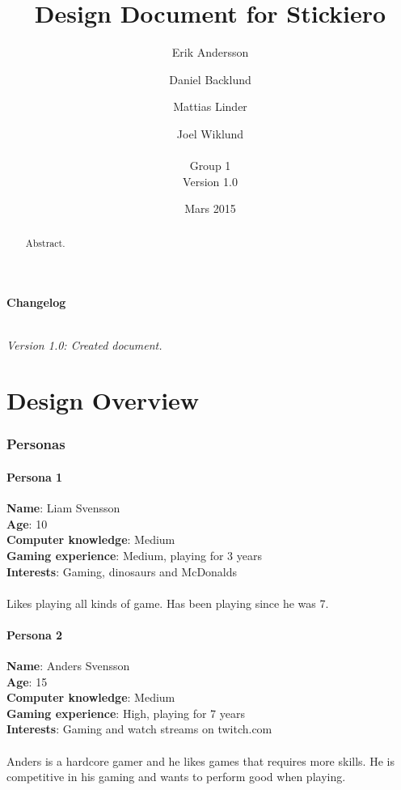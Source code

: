 \documentclass{article}
\title{Design Document for Stickiero}
\author{Erik Andersson \and Daniel Backlund \and Mattias Linder \and Joel Wiklund \\\\Group 1\\Version 1.0}
\date{Mars 2015}
\begin{document}
\maketitle
\clearpage

\begin{abstract}
  Abstract.
\end{abstract}
\tableofcontents

\subsection*{Changelog}
\paragraph{}
\em{}Version 1.0:\em{} Created document.\\ 
\clearpage

\part{Design Overview}
\section{Personas}
\label{sec:label}
\subsection{Persona 1}

\textbf{Name}: Liam Svensson\\
\textbf{Age}: 10\\
\textbf{Computer knowledge}: Medium\\
\textbf{Gaming experience}: Medium, playing for 3 years\\
\textbf{Interests}: Gaming, dinosaurs and McDonalds\\\\
Likes playing all kinds of game. Has been playing since he was 7. 

\subsection{Persona 2}

\textbf{Name}: Anders Svensson\\
\textbf{Age}: 15\\
\textbf{Computer knowledge}: Medium\\
\textbf{Gaming experience}: High, playing for 7 years\\
\textbf{Interests}: Gaming and watch streams on twitch.com\\\\
Anders is a hardcore gamer and he likes games that requires more skills. He is competitive in his gaming and wants to perform good when playing.
\end{document}
